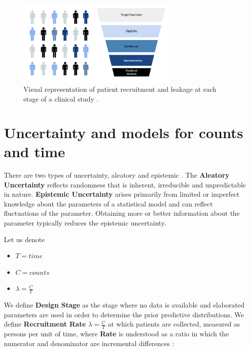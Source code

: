 \begin{figure}[h]
  \centering
  \includegraphics[width=0.7\textwidth]{fig_2_1_b.png}
  \caption{Visual representation of patient recruitment and leakage at each stage of a clinical study \citep{piantadosi2022principles, whelan2018high, bogin2022lasagna}.}
  \label{fig:2_1_b}
\end{figure}

\section{Uncertainty and models for counts and time}

There are two types of uncertainty, aleatory and epistemic \citep{ohagan2006}. The \textbf{Aleatory Uncertainty} reflects randomness that is inherent, irreducible and unpredictable in nature. \textbf{Epistemic Uncertainty} arises primarily from limited or imperfect knowledge about the parameters of a statistical model and can reflect fluctuations of the parameter. Obtaining more or better information about the parameter typically reduces the epistemic uncertainty. 


Let us denote

\begin{itemize}
\item $T=time$
\item $C=counts$
\item $\lambda=\frac{C}{T}$
\end{itemize}

We define \textbf{Design Stage} as the stage where no data is available and elaborated parameters are used in order to determine the prior predictive distributions. We define \textbf{Recruitment Rate} $\lambda=\frac{C}{T}$ at which patients are collected, measured as persons per unit of time, where \textbf{Rate} is understood as a ratio in which the numerator and denominator are incremental differences \citep{piantadosi2024clinical}:

